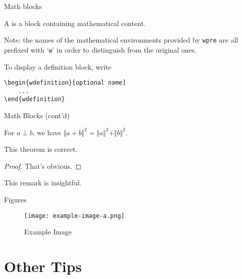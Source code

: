 \documentclass[no-math, aspectratio=1610, 10pt]{beamer}
\begin{document}
    \begin{frame}[fragile]{Math blocks}
        \begin{wdefinition}
            A  is a block containing mathematical content.
        \end{wdefinition}

        \alert{Note:} the names of the mathematical environments provided by \texttt{wpre} are all prefixed with `\texttt{w}' in order to distinguish from the original ones.

        \begin{wexample}
            To display a definition block, write
            \begin{verbatim}
\begin{wdefinition}[optional name]
    ...
\end{wdefinition}\end{verbatim}
        \end{wexample}
    \end{frame}

    \begin{frame}{Math Blocks (cont'd)}
        \begin{wlemma}
            For $a\perp b$, we have $\Vert a + b\Vert^2 = \Vert a\Vert^2 + \Vert b\Vert^2$.
        \end{wlemma}

        \begin{wtheorem}
            This theorem is correct.
        \end{wtheorem}

        \begin{proof}
            That's obvious.
        \end{proof}

        \begin{wremark}
            This remark is insightful.
        \end{wremark}
    \end{frame}

    \begin{frame}{Figures}
        \begin{figure}
            \texttt{[image: example-image-a.png]}
            \caption{Example Image}
        \end{figure}
    \end{frame}

    \section{Other Tips}
\end{document}
